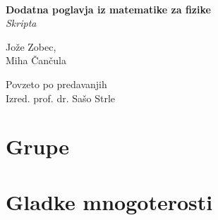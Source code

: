\documentclass[a4paper]{book}
\begin{document}
\begin{titlepage}
	\begin{center}
	\ \\[5cm]
	\LARGE{\bf Dodatna poglavja iz matematike za fizike}\\[0.5cm]
	\large{\it Skripta}\\[3cm]
	\begin{minipage}{0.4\textwidth}\small
		\begin{flushleft}
			\large{Jo\v ze Zobec,}\\[0.5cm]
			\large{Miha \v Can\v cula}
		\end{flushleft}
	\end{minipage}
	\begin{minipage}{0.4\textwidth}\small
		\begin{flushright}
			\large{\sc Povzeto po predavanjih}\\[0.5cm]
			\large{Izred. prof. dr. Sa\v so Strle}
		\end{flushright}
	\end{minipage}
	\end{center}
\end{titlepage}



\part{Grupe}







\part{Gladke mnogoterosti}


\end{document}
